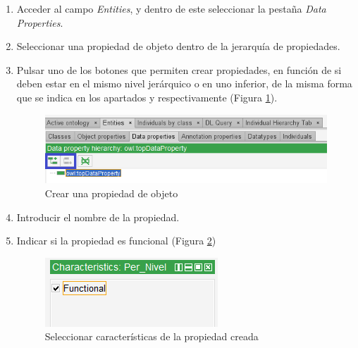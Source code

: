 \begin{enumerate}
    \item Acceder al campo \textit{Entities}, y dentro de este seleccionar la pestaña \textit{Data Properties}.
    \item Seleccionar una propiedad de objeto dentro de la jerarquía de propiedades.
    \item Pulsar uno de los botones que permiten crear propiedades, en función de si deben estar en el mismo nivel jerárquico o 
    en uno inferior, de la misma forma que se indica en los apartados  y 
    respectivamente (Figura \ref*{CreateDataProp_1}).
    
    \begin{figure}[H]
        \centering
        \includegraphics[scale=0.6]{Figures/Protege/CreateDataProp_1.png}
        \caption{Crear una propiedad de objeto}
        \label{CreateDataProp_1}
    \end{figure}

    \item Introducir el nombre de la propiedad.
    \item Indicar si la propiedad es funcional (Figura \ref*{CreateDataProp_2})
    \begin{figure}[H]
        \centering
        \includegraphics[scale=0.6]{Figures/Protege/CreateDataProp_2.png}
        \caption{Seleccionar características de la propiedad creada}
        \label{CreateDataProp_2}
    \end{figure}


\end{enumerate}
